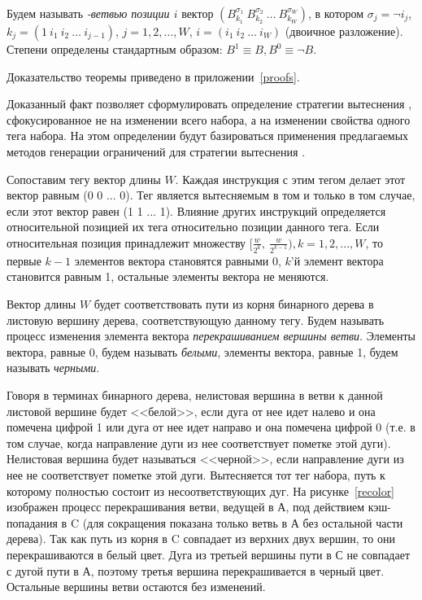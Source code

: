 Будем называть \emph{\PseudoLRU-ветвью позиции $i$} вектор
$(B_{k_1}^{\sigma_1}~B_{k_2}^{\sigma_2}~\dots~B_{k_W}^{\sigma_W})$,
в котором $\sigma_j = \neg i_j$, $k_j = (1~i_1~i_2~\dots~i_{j-1})$,
$j = 1, 2, \dots, W$, $i = (i_1~i_2~\dots~i_W)$ (двоичное
разложение). Степени определены стандартным образом: $B^1 \equiv B,
B^0 \equiv \neg B$.

\begin{theorem}\label{thm_pseudoLRU_invariant} \PseudoLRUInvariant
\end{theorem}
Доказательство теоремы приведено в приложении~\ref{proofs}.

Доказанный факт позволяет сформулировать определение стратегии
вытеснения \PseudoLRU, сфокусированное не на изменении всего набора,
а на изменении свойства одного тега набора. На этом определении
будут базироваться применения предлагаемых методов генерации
ограничений для стратегии вытеснения \PseudoLRU.

\begin{utv}
Сопоставим тегу вектор длины $W$. Каждая инструкция с этим тегом
делает этот вектор равным (0 0 ... 0). Тег является вытесняемым в
том и только в том случае, если этот вектор равен (1 1 ... 1).
Влияние других инструкций определяется относительной позицией их
тега относительно позиции данного тега. Если относительная позиция
принадлежит множеству $[\frac{w}{2^k},~\frac{w}{2^{k-1}}), k =
1,2,...,W$, то первые $k{-}1$ элементов вектора становятся равными
0, $k$'й элемент вектора становится равным 1, остальные элементы
вектора не меняются.
\end{utv}

Вектор длины $W$ будет соответствовать пути из корня бинарного
дерева в листовую вершину дерева, соответствующую данному тегу.
Будем называть процесс изменения элемента вектора
\emph{перекрашиванием вершины ветви}. Элементы вектора, равные 0,
будем называть \emph{белыми}, элементы вектора, равные 1, будем
называть \emph{черными}.

Говоря в терминах бинарного дерева, нелистовая вершина в ветви к
данной листовой вершине будет <<белой>>, если дуга от нее идет
налево и она помечена цифрой 1 или дуга от нее идет направо и она
помечена цифрой 0 (т.е. в том случае, когда направление дуги из нее
соответствует пометке этой дуги). Нелистовая вершина будет
называться <<черной>>, если направление дуги из нее не соответствует
пометке этой дуги. Вытесняется тот тег набора, путь к которому
полностью состоит из несоответствующих дуг. На рисунке~\ref{recolor}
изображен процесс перекрашивания ветви, ведущей в А, под действием
кэш-попадания в C (для сокращения показана только ветвь в А без
остальной части дерева). Так как путь из корня в C совпадает из
верхних двух вершин, то они перекрашиваются в белый цвет. Дуга из
третьей вершины пути в С не совпадает с дугой пути в А, поэтому
третья вершина перекрашивается в черный цвет. Остальные вершины
ветви остаются без изменений.

